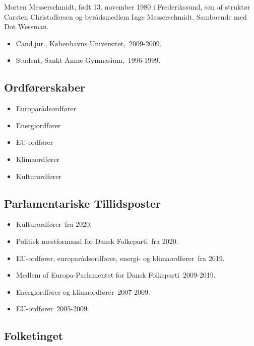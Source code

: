 \documentclass[11pt, a4paper]{awesome-cv}
\begin{document}
\makecvheader[R]
\makelettertitle
\begin{cvletter}
Morten Messerschmidt, født 13. november 1980 i Frederikssund, søn af struktør Carsten Christoffersen og byrådsmedlem Inge Messerschmidt. Samboende med Dot Wessman.

\begin{itemize}
\item Cand.jur., Københavns Universitet, 2009-2009.
\item Student, Sankt Annæ Gymnasium, 1996-1999.
\end{itemize}
\subsection*{Ordførerskaber}
\begin{itemize}
\item Europarådsordfører
\item Energiordfører
\item EU-ordfører
\item Klimaordfører
\item Kulturordfører
\end{itemize}
\subsection*{Parlamentariske Tillidsposter}
\begin{itemize}
\item Kulturordfører fra 2020.
\item Politisk næstformand for Dansk Folkeparti fra 2020.
\item EU-ordfører, europarådsordfører, energi- og klimaordfører fra 2019.
\item Medlem af Europa-Parlamentet for Dansk Folkeparti 2009-2019.
\item Energiordfører og klimaordfører 2007-2009.
\item EU-ordfører 2005-2009.
\end{itemize}
\subsection*{Folketinget}

\end{cvletter}
\end{document}
